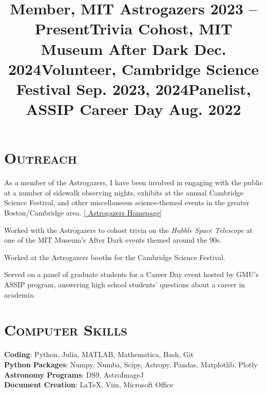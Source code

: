 \documentclass[marg, centered]{res}
\begin{document}
\begin{resume}
\section{{\scshape \bfseries Outreach}}

\title{\textbf{Member}, MIT Astrogazers \hfill \textbf{2023 -- Present}}
\begin{position}
{\small As a member of the Astrogazers, I have been involved in engaging with the public at a number of sidewalk observing nights, exhibits at the annual Cambridge Science Festival, and other miscellaneous science-themed events in the greater Boston/Cambridge area. [\href{https://astrogazers.mit.edu/}{\color{dkbu} Astrogazers Homepage}]}
\end{position}

\title{\textbf{Trivia Cohost}, MIT Museum After Dark \hfill \textbf{Dec. 2024}}
\begin{position}
{\small Worked with the Astrogazers to cohost trivia on the \textit{Hubble Space Telescope} at one of the MIT Museum's After Dark events themed around the 90s.}
\end{position}

\title{\textbf{Volunteer}, Cambridge Science Festival \hfill \textbf{Sep. 2023, 2024}}
\begin{position}
{\small Worked at the Astrogazers booths for the Cambridge Science Festival.}
\end{position}

\title{\textbf{Panelist}, ASSIP Career Day \hfill \textbf{Aug. 2022}}
\begin{position}
{\small Served on a panel of graduate students for a Career Day event hosted by GMU's ASSIP program, answering high school students' questions about a career in academia.}
\end{position}


\section{\scshape \bfseries Computer Skills}

\textbf{Coding}{: Python, Julia, MATLAB, Mathematica, Bash, Git} \\ 
\textbf{Python Packages}{: Numpy, Numba, Scipy, Astropy, Pandas, Matplotlib, Plotly} \\
\textbf{Astronomy Programs}{: DS9, AstroImageJ} \\
\textbf{Document Creation}{: \LaTeX, Vim, Microsoft Office} \\



\end{resume}
\end{document}

